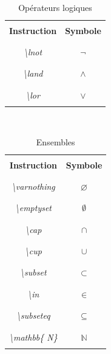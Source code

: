 \documentclass[a4paper, 10pt]{book}
\begin{document}
\begin{table}[h]
\caption{{Opérateurs logiques}}
\textit{\\}
\centering
\begin{tabular}{|c|c|}
\hline \hline \\
\textbf{Instruction} & \textbf{Symbole} \\ \\
\hline \hline \\
\textit{\textbackslash lnot} & $ \lnot $ \\ \\ 
\hline \\
\textit{\textbackslash land} & $\land$ \\ \\
\hline \\
\textit{\textbackslash lor} & $\lor$ \\ \\
\hline
\end{tabular} 
\end{table}

\begin{table}[ht]
\caption{{Ensembles}}
\textit{\\}
\centering
\begin{tabular}{|c|c|}
\hline \\
\textbf{Instruction} & \textbf{Symbole} \\ \\
\hline \hline \\
\textit{\textbackslash varnothing} & $\varnothing $ \\ \\
\hline \\
\textit{\textbackslash emptyset} & $ \emptyset $ \\ \\
\hline \\
\textit{\textbackslash cap} & $ \cap $ \\ \\
\hline \\
\textit{\textbackslash cup} & $ \cup $ \\ \\
\hline \\
\textit{\textbackslash subset} & $ \subset $ \\ \\
\hline \\
\textit{\textbackslash in} & $ \in$ \\ \\
\hline \\
\textit{\textbackslash subseteq} & $ \subseteq$ \\ \\
\hline \\
\textit{\textbackslash mathbb\{ N\}} & $ \mathbb{N} $  \\ \\
\hline
\end{tabular}
\end{table}
\end{document}

